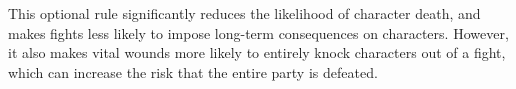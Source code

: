         This optional rule significantly reduces the likelihood of character death, and makes fights less likely to impose long-term consequences on characters.
        However, it also makes vital wounds more likely to entirely knock characters out of a fight, which can increase the risk that the entire party is defeated.
